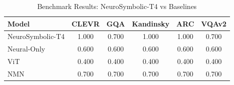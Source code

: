 
\begin{table}[t]
\centering
\caption{Benchmark Results: NeuroSymbolic-T4 vs Baselines}
\label{tab:benchmark_results}
\begin{tabular}{lccccc}
\toprule
Model & CLEVR & GQA & Kandinsky & ARC & VQAv2 \\
\midrule
NeuroSymbolic-T4 & 1.000 & 0.700 & 1.000 & 1.000 & 0.700 \\
Neural-Only & 0.600 & 0.600 & 0.600 & 0.600 & 0.600 \\
ViT & 0.400 & 0.400 & 0.400 & 0.400 & 0.400 \\
NMN & 0.700 & 0.700 & 0.700 & 0.700 & 0.700 \\

\bottomrule
\end{tabular}
\end{table}

